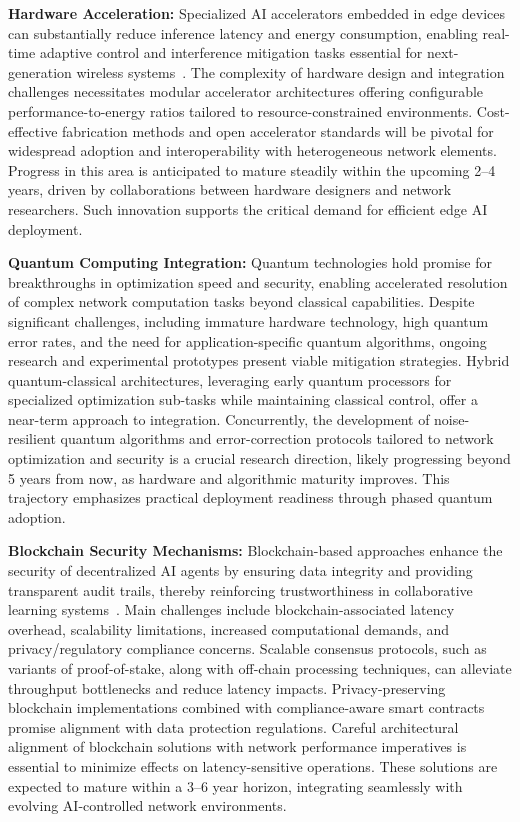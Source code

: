 \documentclass[sigconf]{acmart}
\begin{document}
\textbf{Hardware Acceleration:} Specialized AI accelerators embedded in edge devices can substantially reduce inference latency and energy consumption, enabling real-time adaptive control and interference mitigation tasks essential for next-generation wireless systems~\cite{ref50}. The complexity of hardware design and integration challenges necessitates modular accelerator architectures offering configurable performance-to-energy ratios tailored to resource-constrained environments. Cost-effective fabrication methods and open accelerator standards will be pivotal for widespread adoption and interoperability with heterogeneous network elements. Progress in this area is anticipated to mature steadily within the upcoming 2–4 years, driven by collaborations between hardware designers and network researchers. Such innovation supports the critical demand for efficient edge AI deployment.

\textbf{Quantum Computing Integration:} Quantum technologies hold promise for breakthroughs in optimization speed and security, enabling accelerated resolution of complex network computation tasks beyond classical capabilities. Despite significant challenges, including immature hardware technology, high quantum error rates, and the need for application-specific quantum algorithms, ongoing research and experimental prototypes present viable mitigation strategies. Hybrid quantum-classical architectures, leveraging early quantum processors for specialized optimization sub-tasks while maintaining classical control, offer a near-term approach to integration. Concurrently, the development of noise-resilient quantum algorithms and error-correction protocols tailored to network optimization and security is a crucial research direction, likely progressing beyond 5 years from now, as hardware and algorithmic maturity improves. This trajectory emphasizes practical deployment readiness through phased quantum adoption.

\textbf{Blockchain Security Mechanisms:} Blockchain-based approaches enhance the security of decentralized AI agents by ensuring data integrity and providing transparent audit trails, thereby reinforcing trustworthiness in collaborative learning systems~\cite{ref54}. Main challenges include blockchain-associated latency overhead, scalability limitations, increased computational demands, and privacy/regulatory compliance concerns. Scalable consensus protocols, such as variants of proof-of-stake, along with off-chain processing techniques, can alleviate throughput bottlenecks and reduce latency impacts. Privacy-preserving blockchain implementations combined with compliance-aware smart contracts promise alignment with data protection regulations. Careful architectural alignment of blockchain solutions with network performance imperatives is essential to minimize effects on latency-sensitive operations. These solutions are expected to mature within a 3–6 year horizon, integrating seamlessly with evolving AI-controlled network environments.
\end{document}
